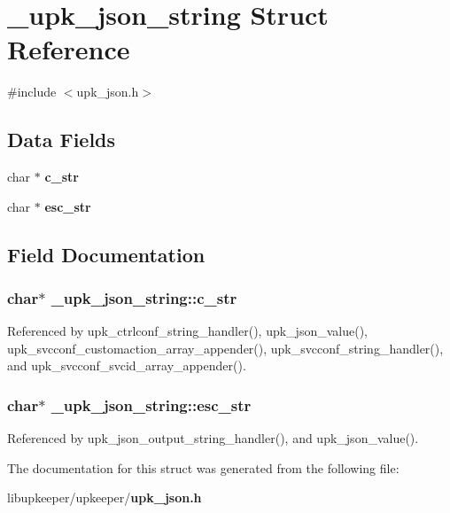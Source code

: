 \section{\_\-upk\_\-json\_\-string Struct Reference}
\label{struct__upk__json__string}


{\ttfamily \#include $<$upk\_\-json.h$>$}

\subsection*{Data Fields}
\begin{DoxyCompactItemize}
\item 
char $\ast$ {\bf c\_\-str}
\item 
char $\ast$ {\bf esc\_\-str}
\end{DoxyCompactItemize}


\subsection{Field Documentation}
\subsubsection[{c\_\-str}]{\setlength{\rightskip}{0pt plus 5cm}char$\ast$ {\bf \_\-upk\_\-json\_\-string::c\_\-str}}\label{struct__upk__json__string_a8b78a10bbc10841a205841c2d7f553ba}


Referenced by upk\_\-ctrlconf\_\-string\_\-handler(), upk\_\-json\_\-value(), upk\_\-svcconf\_\-customaction\_\-array\_\-appender(), upk\_\-svcconf\_\-string\_\-handler(), and upk\_\-svcconf\_\-svcid\_\-array\_\-appender().

\subsubsection[{esc\_\-str}]{\setlength{\rightskip}{0pt plus 5cm}char$\ast$ {\bf \_\-upk\_\-json\_\-string::esc\_\-str}}\label{struct__upk__json__string_a82f33532ffb2237425cf6b618f7aa977}


Referenced by upk\_\-json\_\-output\_\-string\_\-handler(), and upk\_\-json\_\-value().



The documentation for this struct was generated from the following file:\begin{DoxyCompactItemize}
\item 
libupkeeper/upkeeper/{\bf upk\_\-json.h}\end{DoxyCompactItemize}

